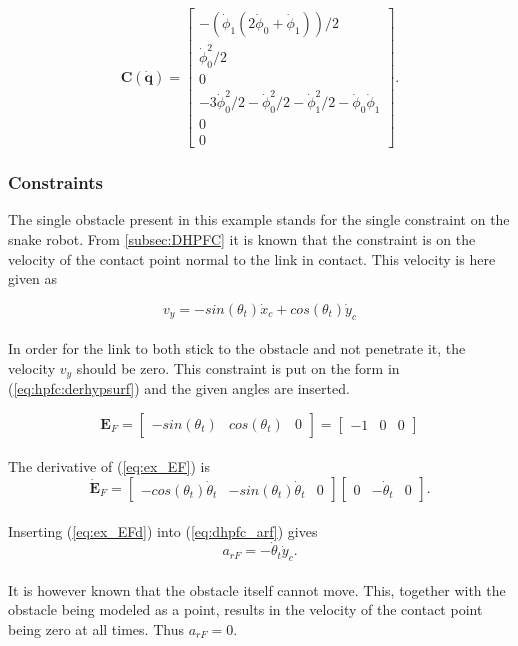 \begin{equation}
    \mathbf{C(\dot{q})} = 
    \begin{bmatrix}
        -(\dot{\phi}_1 (2\dot{\phi}_0+ \dot{\phi}_1))/2 \\
        \dot{\phi}_0^2/2 \\
        0 \\
        -3 \dot{\phi}_0^2/2 - \dot{\phi}_0^2/2 - \dot{\phi}_1^2/2 - \dot{\phi}_0 \dot{\phi}_1 \\
        0 \\ 0
    \end{bmatrix}.
\end{equation}

\subsubsection{Constraints}

The single obstacle present in this example stands for the single constraint on the snake robot. 
From \ref{subsec:DHPFC} it is known that the constraint is on the velocity of the contact point normal to the link in contact. This velocity is here given as

\begin{equation}
    v_y = - sin(\theta_t) \dot{x}_c + cos(\theta_t) \dot{y}_c
\end{equation}
\\
In order for the link to both stick to the obstacle and not penetrate it, the velocity $v_y$ should be zero. This constraint is put on the form in (\ref{eq:hpfc:derhypsurf}) and the given angles are inserted.

\begin{equation}\label{eq:ex_EF}
    \mathbf{E}_F = 
    \begin{bmatrix}
        - sin(\theta_t) & cos(\theta_t) & 0
    \end{bmatrix}
    =
    \begin{bmatrix}
        - 1 & 0 & 0
    \end{bmatrix}
\end{equation}
\\
The derivative of (\ref{eq:ex_EF}) is
\begin{equation}\label{eq:ex_EFd}
    \mathbf{\dot{E}}_F = 
    \begin{bmatrix}
        -cos(\theta_t) \dot{\theta}_t & - sin(\theta_t) \dot{\theta}_t & 0
    \end{bmatrix}
    \begin{bmatrix}
        0 & -\dot{\theta}_t & 0
    \end{bmatrix}.
\end{equation}
\\
Inserting (\ref{eq:ex_EFd}) into (\ref{eq:dhpfc_arf}) gives
\begin{equation}
    a_{rF} = -\dot{\theta}_t \dot{y}_c.
\end{equation}
\\
It is however known that the obstacle itself cannot move. This, together with the obstacle being modeled as a point, results in the velocity of the contact point being zero at all times. Thus $a_{rF}=0$.


